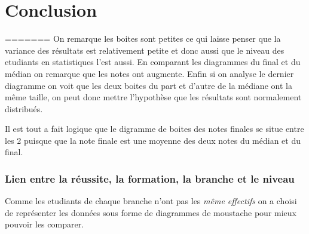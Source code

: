 \documentclass[]{report}
\begin{document}
\section{Conclusion}
=======
On remarque les boites sont petites ce qui laisse penser que la variance des résultats est relativement petite et donc aussi que le niveau des etudiants en statistiques l'est aussi.  En comparant les diagrammes du final et du médian on remarque que les notes ont augmente.  Enfin si on analyse le dernier diagramme on voit que les deux boites du part et d'autre de la médiane ont la même taille, on peut donc mettre l'hypothèse que les résultats sont normalement distribués. 

Il est tout a fait logique que le digramme de boites des notes finales se situe entre les 2 puisque que la note finale est une moyenne des deux notes du médian et du final.
 
	
\subsubsection{Lien entre la réussite, la formation, la branche et le niveau}
Comme les etudiants de chaque branche n'ont pas les \textit{même effectifs} on a choisi de représenter les données sous forme de diagrammes de moustache pour mieux pouvoir les comparer.\\
\end{document}
